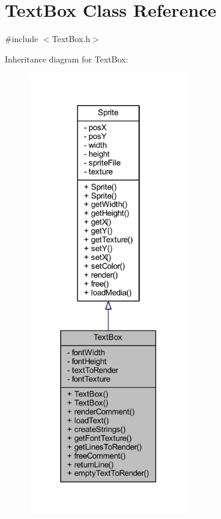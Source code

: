 \hypertarget{class_text_box}{}\section{Text\+Box Class Reference}
\label{class_text_box}


{\ttfamily \#include $<$Text\+Box.\+h$>$}



Inheritance diagram for Text\+Box\+:\nopagebreak
\begin{figure}[H]
\begin{center}
\leavevmode
\includegraphics[height=550pt]{class_text_box__inherit__graph}
\end{center}
\end{figure}


